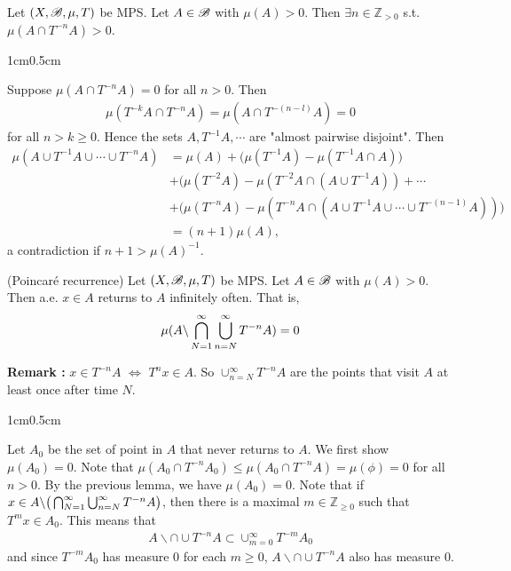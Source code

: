 \documentclass[12pt,a4paper]{report}
\newenvironment{proof}
{\begin{changemargin}{1cm}{0.5cm} 
	}%
	{\end{changemargin}
}
\begin{document}
\lem Let $(X, \mathscr{B}, \mu, T)$ be MPS. Let $A\in \mathscr{B}$ with $\mu(A) >0$. Then $\exists n \in \mathbb{Z}_{>0}$ s.t. $\mu(A \cap T^{-n}A) >0$.
\begin{proof}
\pf Suppose $\mu(A \cap T^{-n}A) =0$ for all $n>0$. Then
\begin{align*}
\mu(T^{-k}A\cap T^{-n}A) = \mu(A \cap T^{-(n-l)}A ) =0
\end{align*}
for all $n>k\geq 0$. Hence the sets $A, T^{-1}A,\cdots$ are "almost pairwise disjoint". Then
\begin{align*}
\mu(A \cup T^{-1}A \cup \cdots \cup T^{-n}A) &= \mu(A) + \big( \mu(T^{-1}A) - \mu(T^{-1}A \cap A) \big)\\
& + \big( \mu(T^{-2}A) - \mu(T^{-2}A \cap (A \cup T^{-1}A)) + \cdots \\
& + \big( \mu(T^{-n}A) - \mu(T^{-n}A \cap (A \cup T^{-1}A \cup \cdots \cup T^{-(n-1)}A) ) \big) \\
& = (n+1) \mu(A),
\end{align*}
a contradiction if $n+1 > \mu(A)^{-1}$.

\eop
\end{proof}
\s

\thm (Poincar\'{e} recurrence) Let $(X,\mathscr{B}, \mu, T)$ be MPS. Let $A \in \mathscr{B}$ with $\mu(A) >0$. Then a.e. $x\in A$ returns to $A$ infinitely often. That is,
\begin{align*}
\mu(A \backslash \bigcap_{N=1}^{\infty}\bigcup_{n=N}^{\infty} T^{-n} A  ) =0
\end{align*}
\s

\textbf{Remark : } $x\in T^{-n} A$ $\Leftrightarrow$ $T^{n}x \in A$. So $\cup_{n=N}^{\infty} T^{-n}A$ are the points that visit $A$ at least once after time $N$. 
\s

\begin{proof}
\pf Let $A_0$ be the set of point in $A$ that never returns to $A$. We first show $\mu(A_0)=0$. Note that $\mu(A_0 \cap T^{-n}A_0) \leq \mu(A_0 \cap T^{-n}A) = \mu(\phi) =0$ for all $n>0$. By the previous lemma, we have $\mu(A_0) =0$. Note that if $x\in A \backslash \big( \bigcap_{N=1}^{\infty}\bigcup_{n=N}^{\infty} T^{-n} A \big)$, then there is a maximal $m\in \mathbb{Z}_{\geq 0}$ such that $T^{m}x \in A_0$. This means that
\begin{align*}
A \backslash \cap \cup T^{-n} A \subset \cup_{m=0}^{\infty}T^{-m}A_0
\end{align*}
and since $T^{-m} A_0$ has measure 0 for each $m\geq 0$, $A \backslash \cap \cup T^{-n} A$ also has measure 0.

\eop
\end{proof}
\s
\end{document}
